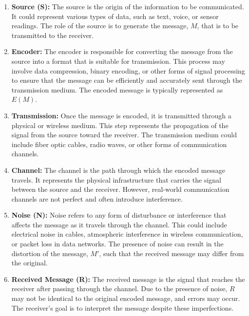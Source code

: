 \documentclass{article}
\begin{document}
\begin{enumerate}
    \item \textbf{Source (S):}
    The source is the origin of the information to be communicated. It could represent various types of data, such as text, voice, or sensor readings. The role of the source is to generate the message, \( M \), that is to be transmitted to the receiver.

    \item \textbf{Encoder:}
    The encoder is responsible for converting the message from the source into a format that is suitable for transmission. This process may involve data compression, binary encoding, or other forms of signal processing to ensure that the message can be efficiently and accurately sent through the transmission medium. The encoded message is typically represented as \( E(M) \).

    \item \textbf{Transmission:}
    Once the message is encoded, it is transmitted through a physical or wireless medium. This step represents the propagation of the signal from the source toward the receiver. The transmission medium could include fiber optic cables, radio waves, or other forms of communication channels.

    \item \textbf{Channel:}
    The channel is the path through which the encoded message travels. It represents the physical infrastructure that carries the signal between the source and the receiver. However, real-world communication channels are not perfect and often introduce interference.

    \item \textbf{Noise (N):}
    Noise refers to any form of disturbance or interference that affects the message as it travels through the channel. This could include electrical noise in cables, atmospheric interference in wireless communication, or packet loss in data networks. The presence of noise can result in the distortion of the message, \( M' \), such that the received message may differ from the original.

    \item \textbf{Received Message (R):}
    The received message is the signal that reaches the receiver after passing through the channel. Due to the presence of noise, \( R \) may not be identical to the original encoded message, and errors may occur. The receiver’s goal is to interpret the message despite these imperfections.


\end{enumerate}
\end{document}
